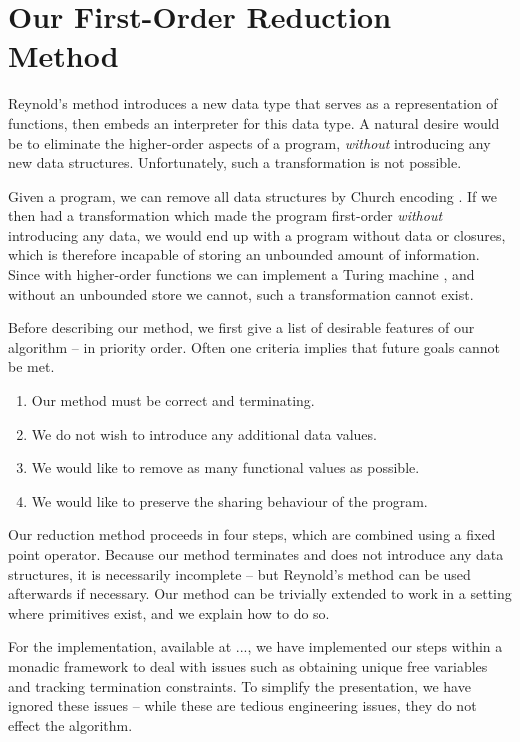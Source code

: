 \documentclass[preprint]{sigplanconf}
\begin{document}
\section{Our First-Order Reduction Method}

Reynold's method introduces a new data type that serves as a representation of functions, then embeds an interpreter for this data type. A natural desire would be to eliminate the higher-order aspects of a program, \textit{without} introducing any new data structures. Unfortunately, such a transformation is not possible.

Given a program, we can remove all data structures by Church encoding \cite{church_encode}. If we then had a transformation which made the program first-order \textit{without} introducing any data, we would end up with a program without data or closures, which is therefore incapable of storing an unbounded amount of information. Since with higher-order functions we can implement a Turing machine \cite{turing:halting}, and without an unbounded store we cannot, such a transformation cannot exist.

Before describing our method, we first give a list of desirable features of our algorithm -- in priority order. Often one criteria implies that future goals cannot be met.

\begin{enumerate}
\item Our method must be correct and terminating.
\item We do not wish to introduce any additional data values.
\item We would like to remove as many functional values as possible.
\item We would like to preserve the sharing behaviour of the program.
\end{enumerate}

Our reduction method proceeds in four steps, which are combined using a fixed point operator. Because our method terminates and does not introduce any data structures, it is necessarily incomplete -- but Reynold's method can be used afterwards if necessary. Our method can be trivially extended to work in a setting where primitives exist, and we explain how to do so.

For the implementation, available at ..., we have implemented our steps within a monadic framework to deal with issues such as obtaining unique free variables and tracking termination constraints. To simplify the presentation, we have ignored these issues -- while these are tedious engineering issues, they do not effect the algorithm.
\end{document}
